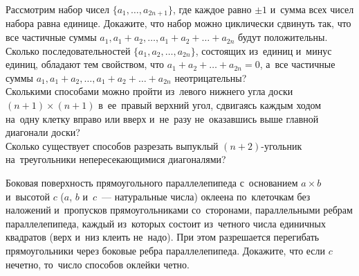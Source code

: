 \begin{problems}
\item
\subproblem
Рассмотрим набор чисел $\{ a_1, \ldots, a_{2n + 1} \}$, где каждое равно
$\pm 1$ и~сумма всех чисел набора равна единице.
Докажите, что набор можно циклически сдвинуть так, что все частичные суммы
$a_1, a_1 + a_2, \ldots,  a_1 + a_2 + \ldots + a_{2n}$ будут положительны.
\\
\subproblem
Сколько последовательностей $\{ a_1, a_2, \ldots, a_{2n} \}$, состоящих
из~единиц и~минус единиц, обладают тем свойством, что
$a_1 + a_2 + \ldots + a_{2n} = 0$, а~все частичные суммы
$a_1, a_1 + a_2, \ldots,  a_1 + a_2 + \ldots + a_{2n}$ неотрицательны?
\\
\subproblem
Сколькими способами можно пройти из~левого нижнего угла доски
$(n + 1) \times (n + 1)$ в~ее~правый верхний угол, сдвигаясь каждым ходом
на~одну клетку вправо или вверх и~не~разу не~оказавшись выше главной диагонали
доски?
\\
\subproblem
Сколько существует способов разрезать выпуклый $(n + 2)$-угольник
на~треугольники непересекающимися диагоналями?


\item
Боковая поверхность прямоугольного параллелепипеда с~основанием $a \times b$
и~высотой $c$ ($a$, $b$ и~$c$~— натуральные числа) оклеена по~клеточкам без
наложений и~пропусков прямоугольниками со~сторонами, параллельными ребрам
параллелепипеда, каждый из~которых состоит из~четного числа единичных квадратов
(верх и~низ клеить не~надо).
При этом разрешается перегибать прямоугольники через боковые ребра
параллелепипеда.
Докажите, что если $c$ нечетно, то~число способов оклейки четно.

\end{problems}

